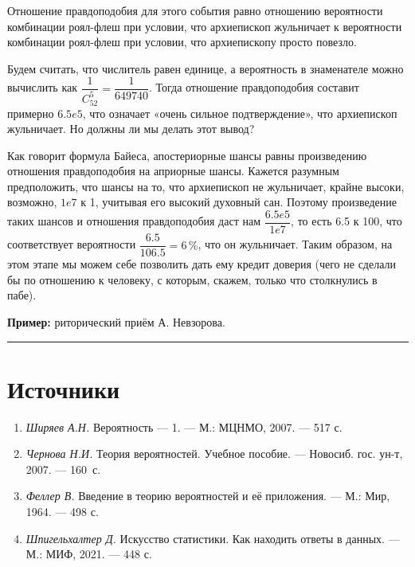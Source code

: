 \documentclass[11pt,a4paper]{article}
\providecommand{\tightlist}{%
      \setlength{\itemsep}{0pt}\setlength{\parskip}{0pt}}
\begin{document}
Отношение правдоподобия для этого события равно отношению вероятности
комбинации роял-флеш при условии, что архиепископ жульничает к
вероятности комбинации роял-флеш при условии, что архиепископу просто
повезло.

Будем считать, что числитель равен единице, а вероятность в знаменателе
можно вычислить как \(\dfrac{1}{C^5_{52}} = \dfrac{1}{649740}\). Тогда
отношение правдоподобия составит примерно \(6.5e5\), что означает «очень
сильное подтверждение», что архиепископ жульничает. Но должны ли мы
делать этот вывод?

Как говорит формула Байеса, апостериорные шансы равны произведению
отношения правдоподобия на априорные шансы. Кажется разумным
предположить, что шансы на то, что архиепископ не жульничает, крайне
высоки, возможно, \(1e7\) к 1, учитывая его высокий духовный сан.
Поэтому произведение таких шансов и отношения правдоподобия даст нам
\(\dfrac{6.5e5}{1e7}\), то есть 6.5 к 100, что соответствует вероятности
\(\dfrac{6.5}{106.5} = 6\,\%\), что он жульничает. Таким образом, на
этом этапе мы можем себе позволить дать ему кредит доверия (чего не
сделали бы по отношению к человеку, с которым, скажем, только что
столкнулись в пабе).

    \textbf{Пример:} риторический приём А. Невзорова.

    \begin{center}\rule{0.5\linewidth}{0.5pt}\end{center}

    \hypertarget{ux438ux441ux442ux43eux447ux43dux438ux43aux438}{%
\section{Источники}\label{ux438ux441ux442ux43eux447ux43dux438ux43aux438}}

\begin{enumerate}
\def\labelenumi{\arabic{enumi}.}
\tightlist
\item
  \emph{Ширяев А.Н.} Вероятность --- 1. --- М.: МЦНМО, 2007. --- 517 с.
\item
  \emph{Чернова Н.И.} Теория вероятностей. Учебное пособие. ---
  Новосиб. гос. ун-т, 2007. --- 160~с.
\item
  \emph{Феллер В.} Введение в теорию вероятностей и её приложения. ---
  М.: Мир, 1964. --- 498 с.
\item
  \emph{Шпигельхалтер Д.} Искусство статистики. Как находить ответы в
  данных. --- М.: МИФ, 2021. --- 448 с.
\end{enumerate}
\end{document}
